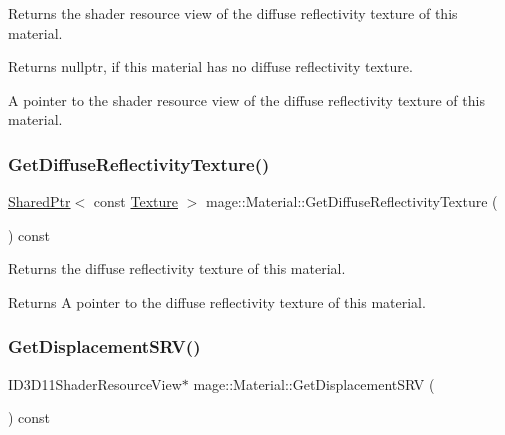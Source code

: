Returns the shader resource view of the diffuse reflectivity texture of this material.

\begin{DoxyReturn}{Returns}
{\ttfamily nullptr}, if this material has no diffuse reflectivity texture. 

A pointer to the shader resource view of the diffuse reflectivity texture of this material. 
\end{DoxyReturn}
\hypertarget{structmage_1_1_material_a5a3a56891f884d054dc09fc88e6d6c89}{}\label{structmage_1_1_material_a5a3a56891f884d054dc09fc88e6d6c89} 
\subsubsection{\texorpdfstring{Get\+Diffuse\+Reflectivity\+Texture()}{GetDiffuseReflectivityTexture()}}
{\footnotesize\ttfamily \hyperlink{namespacemage_a1e01ae66713838a7a67d30e44c67703e}{Shared\+Ptr}$<$ const \hyperlink{classmage_1_1_texture}{Texture} $>$ mage\+::\+Material\+::\+Get\+Diffuse\+Reflectivity\+Texture (\begin{DoxyParamCaption}{ }\end{DoxyParamCaption}) const\hspace{0.3cm}{\ttfamily [noexcept]}}

Returns the diffuse reflectivity texture of this material.

\begin{DoxyReturn}{Returns}
A pointer to the diffuse reflectivity texture of this material. 
\end{DoxyReturn}
\hypertarget{structmage_1_1_material_a638ee0913aa0722f499c883b71549503}{}\label{structmage_1_1_material_a638ee0913aa0722f499c883b71549503} 
\subsubsection{\texorpdfstring{Get\+Displacement\+S\+R\+V()}{GetDisplacementSRV()}}
{\footnotesize\ttfamily I\+D3\+D11\+Shader\+Resource\+View$\ast$ mage\+::\+Material\+::\+Get\+Displacement\+S\+RV (\begin{DoxyParamCaption}{ }\end{DoxyParamCaption}) const\hspace{0.3cm}{\ttfamily [noexcept]}}

